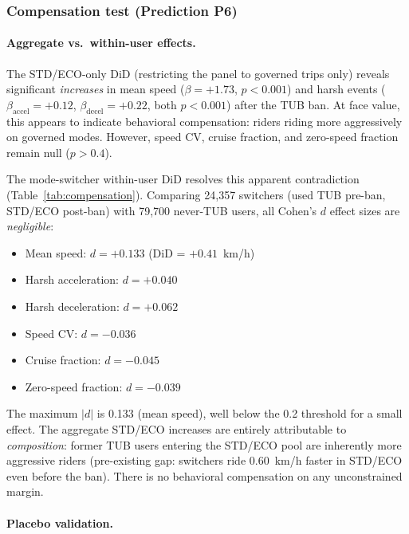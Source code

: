 \subsubsection{Compensation test (Prediction P6)}
\label{sec:res_compensation}

\paragraph{Aggregate vs.\ within-user effects.}

The STD/ECO-only DiD (restricting the panel to governed trips only) reveals significant \textit{increases} in mean speed ($\beta = +1.73$, $p < 0.001$) and harsh events ($\beta_{\text{accel}} = +0.12$, $\beta_{\text{decel}} = +0.22$, both $p < 0.001$) after the TUB ban. At face value, this appears to indicate behavioral compensation: riders riding more aggressively on governed modes. However, speed CV, cruise fraction, and zero-speed fraction remain null ($p > 0.4$).

The mode-switcher within-user DiD resolves this apparent contradiction (Table~\ref{tab:compensation}). Comparing 24,357 switchers (used TUB pre-ban, STD/ECO post-ban) with 79,700 never-TUB users, all Cohen's $d$ effect sizes are \textit{negligible}:

\begin{itemize}
    \item Mean speed: $d = +0.133$ (DiD = $+0.41$~km/h)
    \item Harsh acceleration: $d = +0.040$
    \item Harsh deceleration: $d = +0.062$
    \item Speed CV: $d = -0.036$
    \item Cruise fraction: $d = -0.045$
    \item Zero-speed fraction: $d = -0.039$
\end{itemize}

The maximum $|d|$ is 0.133 (mean speed), well below the 0.2 threshold for a small effect. The aggregate STD/ECO increases are entirely attributable to \textit{composition}: former TUB users entering the STD/ECO pool are inherently more aggressive riders (pre-existing gap: switchers ride 0.60~km/h faster in STD/ECO even before the ban). There is no behavioral compensation on any unconstrained margin.

\paragraph{Placebo validation.}

